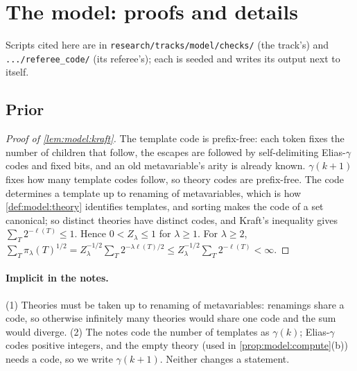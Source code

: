 \section{The model: proofs and details}\label{app:model}

Scripts cited here are in \texttt{research/tracks/model/checks/} (the track's) and \texttt{.../referee\_code/} (its referee's); each is seeded and writes its output next to itself.

\subsection{Prior}\label{app:model:prior}

\begin{proof}[Proof of \cref{lem:model:kraft}]
The template code is prefix-free: each token fixes the number of children that follow, the escapes are followed by self-delimiting Elias-$\gamma$ codes and fixed bits, and an old metavariable's arity is already known. $\gamma(k+1)$ fixes how many template codes follow, so theory codes are prefix-free. The code determines a template up to renaming of metavariables, which is how \cref{def:model:theory} identifies templates, and sorting makes the code of a set canonical; so distinct theories have distinct codes, and Kraft's inequality gives $\sum_T2^{-\ell(T)}\le1$. Hence $0<Z_\lambda\le1$ for $\lambda\ge1$. For $\lambda\ge2$, $\sum_T\pi_\lambda(T)^{1/2}=Z_\lambda^{-1/2}\sum_T2^{-\lambda\ell(T)/2}\le Z_\lambda^{-1/2}\sum_T2^{-\ell(T)}<\infty$.
\end{proof}

\paragraph{Implicit in the notes.} (1) Theories must be taken up to renaming of metavariables: renamings share a code, so otherwise infinitely many theories would share one code and the sum would diverge. (2) The notes code the number of templates as $\gamma(k)$; Elias-$\gamma$ codes positive integers, and the empty theory (used in \cref{prop:model:compute}(b)) needs a code, so we write $\gamma(k+1)$. Neither changes a statement.

